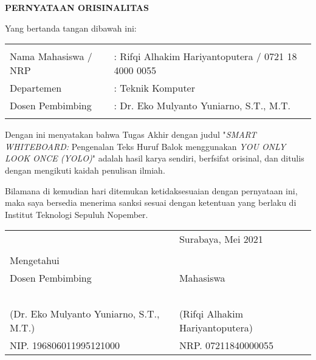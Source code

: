 \begin{center}
  \large
  \textbf{PERNYATAAN ORISINALITAS}
\end{center}

\thispagestyle{empty}

\vspace{2ex}


\noindent Yang bertanda tangan dibawah ini:

\noindent\begin{tabularx}{\textwidth}{X l}
  & \\
  Nama Mahasiswa / NRP &: Rifqi Alhakim Hariyantoputera / 0721 18 4000 0055 \\
  Departemen &: Teknik Komputer \\
  Dosen Pembimbing &: Dr. Eko Mulyanto Yuniarno, S.T., M.T. \\
  & \\
\end{tabularx}

Dengan ini menyatakan bahwa Tugas Akhir dengan judul "\emph{SMART WHITEBOARD:} Pengenalan Teks Huruf Balok menggunakan \emph{YOU ONLY LOOK ONCE (YOLO)}" adalah hasil karya sendiri, berfsifat orisinal, dan ditulis dengan mengikuti kaidah penulisan ilmiah.

Bilamana di kemudian hari ditemukan ketidaksesuaian dengan pernyataan ini, maka saya bersedia menerima sanksi sesuai dengan ketentuan yang berlaku di Institut Teknologi Sepuluh Nopember.

\vspace{8ex}

\noindent\begin{tabularx}{\textwidth}{X l}
  & Surabaya, Mei 2021\\
  & \\
  Mengetahui & \\
  Dosen Pembimbing & Mahasiswa\\
  & \\
  & \\
  & \\
  & \\
  & \\
  (Dr. Eko Mulyanto Yuniarno, S.T., M.T.) & (Rifqi Alhakim Hariyantoputera) \\
  NIP. 196806011995121000 & NRP. 07211840000055\\
\end{tabularx}